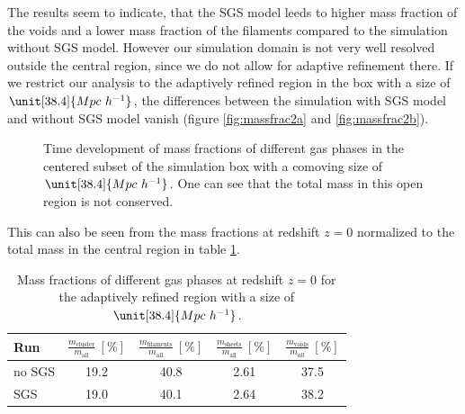 The results seem to indicate, that the SGS model leeds to higher mass fraction
of the voids and a lower mass fraction of the filaments compared to the
simulation without SGS model. However our simulation domain is not very well
resolved outside the central region, since we do not allow for adaptive
refinement there. If we restrict our analysis to the adaptively refined region
in the box with a size of $\unit[38.4]{Mpc\ h^{-1}}$, the differences between
the simulation with SGS model and without SGS model vanish 
(figure \ref{fig:massfrac2a} and \ref{fig:massfrac2b}).
\begin{figure}[tp]
\centering
{}
\caption{Time development of mass fractions of different gas phases in the
centered subset of the simulation box with a comoving size of 
$\unit[38.4]{Mpc\ h^{-1}}$. One can see that the total mass in this open region
is not conserved.}
\end{figure}
This can also be seen from the mass fractions at redshift $z=0$ normalized to
the total mass in the central region in table \ref{tab:massfrac2}. 
\begin{table}[htbp]
\begin{center}
\begin{tabular}{lcccc}
\hline
Run & 
$\frac{m_{\text{cluster}}}{m_{\text{all}}}\ [\%]$ &
$\frac{m_{\text{filaments}}}{m_{\text{all}}}\ [\%]$ &
$\frac{m_{\text{sheets}}}{m_{\text{all}}}\ [\%]$ & 
$\frac{m_{\text{voids}}}{m_{all}}\ [\%]$ \vspace*{1mm} \\
\hline
\hline
no SGS & 19.2 & 40.8 & 2.61 & 37.5\\ 
SGS & 19.0 & 40.1 & 2.64 & 38.2 \\
\hline
\end{tabular}
\end{center}
\caption{Mass fractions of different gas phases at redshift $z=0$ for the
adaptively refined region with a size of $\unit[38.4]{Mpc\ h^{-1}}$.}
\label{tab:massfrac2}
\end{table}
